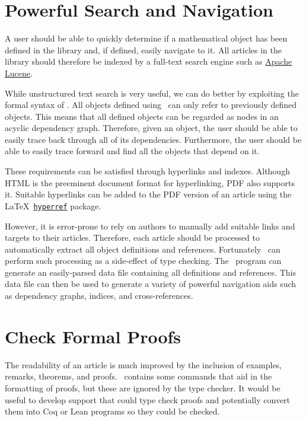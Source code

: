 \documentclass{amsart}
\begin{document}
 \hypertarget{powerful-search-and-navigation}{}
 \section{Powerful Search and Navigation}
 
 A user should be able to quickly determine if a mathematical object has been defined in the library and, if defined,
 easily navigate to it.
 All articles in the library should therefore be indexed by a full-text search engine such as \href{https://lucene.apache.org}{Apache Lucene}.
 
 While unstructured text search is very useful, we can do better by exploiting the formal syntax of \ZN.
 All objects defined using \ZN\ can only refer to previously defined objects.
 This means that all defined objects can be regarded as nodes in an acyclic dependency graph.
 Therefore, given an object, the user should be able to easily trace back through all of its dependencies.
 Furthermore, the user should be able to easily trace forward and find all the objects that depend on it.
 
 These requirements can be satisfied through hyperlinks and indexes.
 Although HTML is the preeminent document format for hyperlinking, PDF also supports it.
 Suitable hyperlinks can be added to the PDF version of an article using the \LaTeX\
 \href{https://ctan.org/pkg/hyperref}{\texttt{hyperref}} package.
 
 However, it is error-prone to rely on authors to manually add suitable links and targets to their articles.
 Therefore, each article should be processed to automatically extract all object definitions and references.
 Fortunately \fuzz\ can perform such processing as a side-effect of type checking.
 The \fuzz\ program can generate an easily-parsed data file containing all definitions and references.
 This data file can then be used to generate a variety of powerful navigation aids such as
 dependency graphs, indices, and cross-references.
 
 \hypertarget{check-formal-proof}{}
 \section{Check Formal Proofs}
 
 The readability of an article is much improved by the inclusion of examples, remarks, theorems, and proofs.
 \ZN\ contains some commands that aid in the formatting of proofs, but these are ignored by the \fuzz type checker.
 It would be useful to develop support that could type check proofs and potentially convert them into Coq or Lean programs
 so they could be checked.
 
\end{document}
